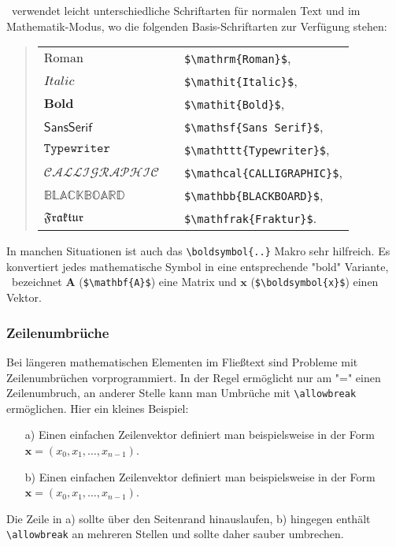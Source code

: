 \latex\ verwendet leicht unterschiedliche Schriftarten für normalen Text und im
Mathe\-matik-Modus, wo die folgenden Basis-Schriftarten zur Verfügung stehen:
%
\begin{quote}
    \begin{tabular}{lcl}
        $\mathrm{Roman}$      & & \verb!$\mathrm{Roman}$!,      \\
				$\mathit{Italic}$     & & \verb!$\mathit{Italic}$!,      \\
				$\mathbf{Bold}$     	& & \verb!$\mathit{Bold}$!,      \\
        $\mathsf{Sans Serif}$ & & \verb!$\mathsf{Sans Serif}$!, \\
        $\mathtt{Typewriter}$ & & \verb!$\mathttt{Typewriter}$!, \\
				$\mathcal{CALLIGRAPHIC}$ & & \verb!$\mathcal{CALLIGRAPHIC}$!,\\
				$\mathbb{BLACKBOARD}$ & & \verb!$\mathbb{BLACKBOARD}$!,\\
				$\mathfrak{Fraktur}$ & & \verb!$\mathfrak{Fraktur}$!.
    \end{tabular}
\end{quote}
%
In manchen Situationen ist auch das \verb!\boldsymbol{..}! Makro sehr hilfreich. 
Es konvertiert jedes mathematische Symbol in eine entsprechende "bold" Variante,
\zB\ bezeichnet $\mathbf{A}$ (\verb!$\mathbf{A}$!) eine Matrix und $\boldsymbol{x}$ 
(\verb!$\boldsymbol{x}$!) einen Vektor.


\subsubsection{Zeilenumbrüche}

Bei längeren mathematischen Elementen im Fließtext sind Probleme mit
Zeilenumbrüchen vorprogrammiert. In der Regel ermöglicht \latex nur am "="
einen Zeilenumbruch, an anderer Stelle kann man Umbrüche mit
\verb|\allowbreak| ermöglichen. Hier ein kleines Beispiel:
%
\begin{itemize}
	\item[a)] Einen einfachen Zeilenvektor definiert man beispielsweise in der
	Form $\boldsymbol{x} = (x_0, x_1, \ldots, x_{n-1})$.
	\item[b)] Einen einfachen Zeilenvektor definiert man beispielsweise in der
	Form $\boldsymbol{x} = (x_0,\allowbreak x_1,\allowbreak\ldots,\allowbreak
	x_{n-1})$.
\end{itemize}
%
Die Zeile in a) sollte über den Seitenrand hinauslaufen, b) hingegen enthält
\verb|\allowbreak| an mehreren Stellen und sollte daher sauber umbrechen.


